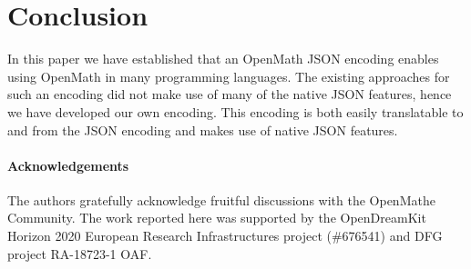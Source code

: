\section{Conclusion}\label{sec:concl}

In this paper we have established that an OpenMath JSON encoding enables using OpenMath in many programming languages. 
The existing approaches for such an encoding did not make use of many of the native JSON features, hence we have developed our own encoding. 
This encoding is both easily translatable to and from the JSON encoding and makes use of native JSON features. 

\paragraph*{Acknowledgements}
The authors gratefully acknowledge fruitful discussions with the OpenMathe Community. The
work reported here was supported by the OpenDreamKit Horizon 2020 European Research
Infrastructures project (\#676541) and DFG project RA-18723-1 OAF.


